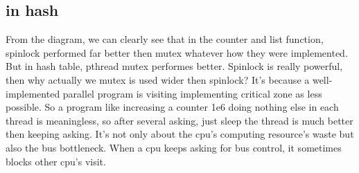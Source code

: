 \documentclass{article}
\begin{document}
		\subsection{\textbf{in hash}}
		\begin{center}
		\end{center}
		From the diagram, we can clearly see that in the counter and list function, spinlock performed far better then mutex whatever how they were implemented. But in hash table, pthread mutex performes better. Spinlock is really powerful, then why actually we mutex is used wider then spinlock? It's because a well-implemented parallel program is visiting implementing critical zone as less  possible. So a program like increasing a counter 1e6 doing nothing else in each thread is meaningless, so after several asking, just sleep the thread is much better then keeping asking. It's not only about the cpu's computing resource's waste but also the bus bottleneck. When a cpu keeps asking for bus control, it sometimes blocks other cpu's visit. 
\end{document}
